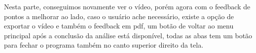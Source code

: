 Nesta parte, conseguimos novamente ver o vídeo, porém agora com o feedback de pontos a melhorar ao lado, caso o usuário ache necessário, existe a opção de exportar o vídeo e também o feedback em pdf, um botão de voltar ao menu principal após a conclusão da
análise está disponível, todas as abas tem um botão para fechar o programa também no canto superior direito da tela.
